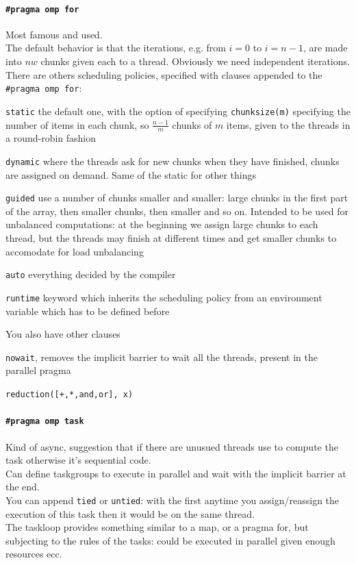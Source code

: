 \documentclass[10pt]{report}
\begin{document}
\paragraph{\texttt{\#pragma omp for}} Most famous and used.\\
The default behavior is that the iterations, e.g. from $i=0$ to $i=n-1$, are made into $nw$ chunks given each to a thread. Obviously we need independent iterations. There are others scheduling policies, specified with clauses appended to the \texttt{\#pragma omp for}:
\begin{list}{}{}
	\item \texttt{static} the default one, with the option of specifying \texttt{chunksize(m)} specifying the number of items in each chunk, so $\frac{n-1}{m}$ chunks of $m$ items, given to the threads in a round-robin fashion
	\item \texttt{dynamic} where the threads ask for new chunks when they have finished, chunks are assigned on demand. Same of the static for other things
	\item \texttt{guided} use a number of chunks smaller and smaller: large chunks in the first part of the array, then smaller chunks, then smaller and so on. Intended to be used for unbalanced computations: at the beginning we assign large chunks to each thread, but the threads may finish at different times and get smaller chunks to accomodate for load unbalancing
	\item \texttt{auto} everything decided by the compiler
	\item \texttt{runtime} keyword which inherits the scheduling policy from an environment variable which has to be defined before 
\end{list}
You also have other clauses
\begin{list}{}{}
	\item \texttt{nowait}, removes the implicit barrier to wait all the threads, present in the parallel pragma
	\item \texttt{reduction([+,*,and,or], x)}
\end{list}
\paragraph{\texttt{\#pragma omp task}} Kind of async, suggestion that if there are unusued threads use to compute the task otherwise it's sequential code.\\
Can define taskgroups to execute in parallel and wait with the implicit barrier at the end.\\
You can append \texttt{tied} or \texttt{untied}: with the first anytime you assign/reassign the execution of this task then it would be on the same thread.\\
The taskloop provides something similar to a map, or a pragma for, but subjecting to the rules of the tasks: could be executed in parallel given enough resources ecc.
\end{document}
